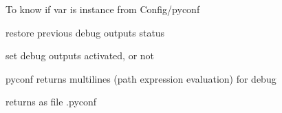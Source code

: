 \documentclass[a4paper,10pt,english]{sphinxmanual}
\begin{document}

\begin{fulllineitems}
\label{\detokenize{apidoc_src/src:src.debug.isTypeConfig}}
To know if var is instance from Config/pyconf

\end{fulllineitems}


\begin{fulllineitems}
\label{\detokenize{apidoc_src/src:src.debug.pop_debug}}
restore previous debug outputs status

\end{fulllineitems}


\begin{fulllineitems}
\label{\detokenize{apidoc_src/src:src.debug.push_debug}}
set debug outputs activated, or not

\end{fulllineitems}


\begin{fulllineitems}
\label{\detokenize{apidoc_src/src:src.debug.saveConfigDbg}}
pyconf returns multilines (path expression evaluation) for debug

\end{fulllineitems}


\begin{fulllineitems}
\label{\detokenize{apidoc_src/src:src.debug.saveConfigStd}}
returns as file .pyconf

\end{fulllineitems}
\end{document}

